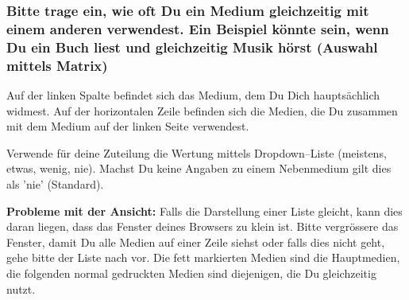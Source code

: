 \subsubsection*{Bitte trage ein, wie oft Du ein Medium gleichzeitig mit einem anderen verwendest. Ein Beispiel könnte sein, wenn Du ein Buch liest und gleichzeitig Musik hörst (Auswahl mittels Matrix)}
Auf der linken Spalte befindet sich das Medium, dem Du Dich hauptsächlich widmest. Auf der horizontalen Zeile befinden sich die Medien, die Du zusammen mit dem Medium auf der linken Seite verwendest.\par
Verwende für deine Zuteilung die Wertung mittels Dropdown--­Liste (meistens, etwas, wenig, nie). Machst Du keine Angaben zu einem Nebenmedium gilt dies als 'nie' (Standard).\par
\textbf{Probleme mit der Ansicht:} Falls die Darstellung einer Liste gleicht, kann dies daran liegen, dass das Fenster deines Browsers zu klein ist. Bitte vergrössere das Fenster, damit Du alle Medien auf einer Zeile siehst oder falls dies nicht geht, gehe bitte der Liste nach vor. Die fett markierten Medien sind die Hauptmedien, die folgenden normal gedruckten Medien sind diejenigen, die Du gleichzeitig nutzt.\par
